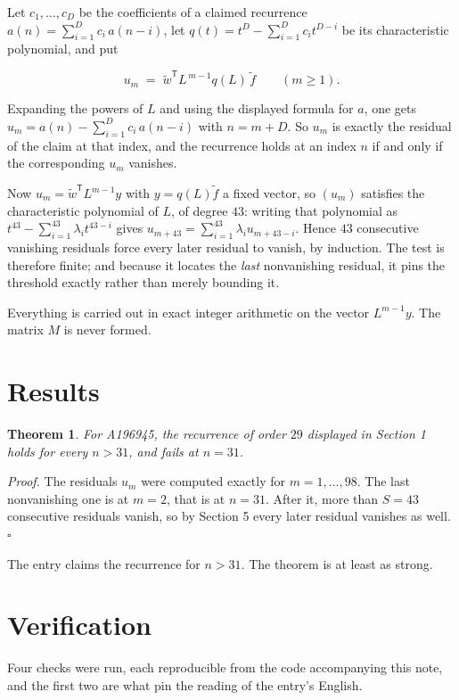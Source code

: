 \documentclass[11pt]{article}
\newtheorem{theorem}{Theorem}
\theoremstyle{definition}
\begin{document}
Let $c_1,\dots,c_D$ be the coefficients of a claimed recurrence $a(n) = \sum_{i=1}^{D} c_i\,a(n-i)$, let $q(t) = t^{D} - \sum_{i=1}^{D} c_i t^{D-i}$ be its characteristic polynomial, and put

\[u_m \;=\; \tilde w^{\mathsf T} L^{\,m-1} q(L)\,\tilde f \qquad (m \ge 1).\]

Expanding the powers of $L$ and using the displayed formula for $a$, one gets $u_m = a(n) - \sum_{i=1}^{D} c_i\,a(n-i)$ with $n = m + D$. So $u_m$ is exactly the residual of the claim at that index, and the recurrence holds at an index $n$ if and only if the corresponding $u_m$ vanishes.

Now $u_m = \tilde w^{\mathsf T} L^{m-1} y$ with $y = q(L)\tilde f$ a fixed vector, so $(u_m)$ satisfies the characteristic polynomial of $L$, of degree $43$: writing that polynomial as $t^{43} - \sum_{i=1}^{43} \lambda_i t^{43-i}$ gives $u_{m+43} = \sum_{i=1}^{43} \lambda_i u_{m+43-i}$. Hence $43$ consecutive vanishing residuals force every later residual to vanish, by induction. The test is therefore finite; and because it locates the {\itshape last} nonvanishing residual, it pins the threshold exactly rather than merely bounding it.

Everything is carried out in exact integer arithmetic on the vector $L^{m-1}y$. The matrix $M$ is never formed.

\section{Results}

\begin{theorem} For A196945, the recurrence of order $29$ displayed in Section 1 holds for every $n > 31$, and fails at $n = 31$.\end{theorem}

{\itshape Proof.} The residuals $u_m$ were computed exactly for $m = 1,\dots,98$. The last nonvanishing one is at $m = 2$, that is at $n = 31$. After it, more than $S = 43$ consecutive residuals vanish, so by Section 5 every later residual vanishes as well. $\square$

The entry claims the recurrence for $n > 31$. The theorem is at least as strong.

\section{Verification}

Four checks were run, each reproducible from the code accompanying this note, and the first two are what pin the reading of the entry's English.
\end{document}
